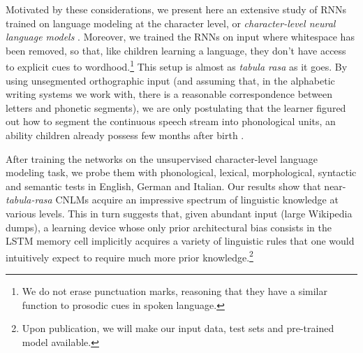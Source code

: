 Motivated by these considerations, we present here an extensive study
of RNNs trained on language modeling at the character level, or
\emph{character-level neural language models}
\cite[CNLMs,][]{Mikolov:etal:2011,Sutskever:etal:2011,DBLP:journals/corr/Graves13}. Moreover,
we trained the RNNs on input where whitespace has been removed, so
that, like children learning a language, they don't have access to
explicit cues to wordhood.\footnote{We do not erase punctuation marks,
  reasoning that they have a similar function to prosodic cues in
  spoken language.} This setup is almost as \emph{tabula rasa} as it
goes. By using unsegmented orthographic input (and assuming that, in
the alphabetic writing systems we work with, there is a reasonable
correspondence between letters and phonetic segments), we are only
postulating that the learner figured out how to segment the continuous
speech stream into phonological units, an ability children
already possess few months after birth
\cite[e.g.,][]{Maye:etal:2002,Kuhl:2004}.

After training the networks on the unsupervised character-level
language modeling task, we probe them with phonological, lexical,
morphological, syntactic and semantic tests in English, German and
Italian. Our results show that near-\emph{tabula-rasa} CNLMs acquire
an impressive spectrum of linguistic knowledge at various levels.
This in turn suggests that, given abundant input (large Wikipedia
dumps), a learning device whose only prior architectural bias consists
in the LSTM memory cell implicitly acquires a variety of linguistic
rules that one would intuitively expect to require much more prior
knowledge.\footnote{Upon publication, we will make our input data, test sets and pre-trained model available.}
